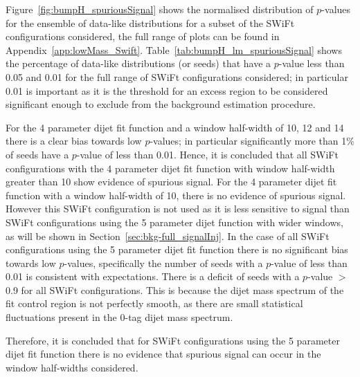 Figure~\ref{fig:bumpH_spuriousSignal} shows the normalised distribution of \mbox{$p$-value}s for the ensemble of data-like distributions
for a subset of the SWiFt configurations considered, the full range of plots can be found in Appendix~\ref{app:lowMass_Swift}.
Table~\ref{tab:bumpH_lm_spuriousSignal} shows the percentage of data-like distributions (or seeds)
that have a \bh{} \mbox{$p$-value} less than %
0.05 and 0.01 for the full range of SWiFt configurations considered;
in particular 0.01 is important as it is the threshold for an excess region to be considered significant enough
to exclude from the background estimation procedure.

For the 4 parameter dijet fit function and a window half-width of 10, 12 and 14
there is a clear bias towards low \bh{} \mbox{$p$-value}s;
in particular significantly more than 1\% of seeds have a \bh{} \mbox{$p$-value} of less than 0.01.
Hence, it is concluded that all SWiFt configurations with the 4 parameter dijet fit function with window half-width greater than 10
show evidence of spurious signal.
For the 4 parameter dijet fit function with a window half-width of 10, there is no evidence of spurious signal.
However this SWiFt configuration is not used as it is less sensitive to signal than SWiFt configurations
using the 5 parameter dijet function with wider windows, as will be shown in Section~\ref{sec:bkg-full_signalInj}.
In the case of all SWiFt configurations using the 5 parameter dijet fit function
there is no significant bias towards low \bh{} \mbox{$p$-value}s,
specifically the number of seeds with a \bh{} \mbox{$p$-value} of less than 0.01 is consistent with expectations.
There is a deficit of seeds with a \bh{} $p$-value $>$ 0.9 for all SWiFt configurations.
This is because the dijet mass spectrum of the fit control region is not perfectly smooth,
as there are small statistical fluctuations present in the 0-tag dijet mass spectrum.

Therefore, it is concluded that for SWiFt configurations using the 5 parameter dijet fit function
there is no evidence that spurious signal can occur in the window half-widths considered.

